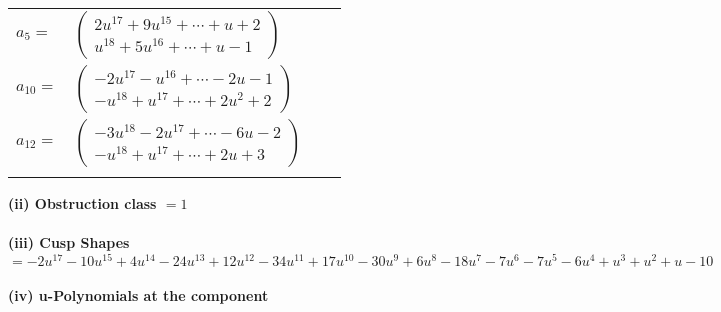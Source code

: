 \documentclass[1p]{elsarticle_modified}
\theoremstyle{definition}
\begin{document}
\begin{tabular}{m{7pt} m{180pt} m{7pt} m{180pt} }
\flushright $a_{5}=$&$\begin{pmatrix}2 u^{17}+9 u^{15}+\cdots+u+2\\u^{18}+5 u^{16}+\cdots+u-1\end{pmatrix}$ \\
\flushright $a_{10}=$&$\begin{pmatrix}-2 u^{17}- u^{16}+\cdots-2 u-1\\- u^{18}+u^{17}+\cdots+2 u^2+2\end{pmatrix}$ \\
\flushright $a_{12}=$&$\begin{pmatrix}-3 u^{18}-2 u^{17}+\cdots-6 u-2\\- u^{18}+u^{17}+\cdots+2 u+3\end{pmatrix}$\\&\end{tabular}
\flushleft \textbf{(ii) Obstruction class $= 1$}\\~\\
\flushleft \textbf{(iii) Cusp Shapes $= -2 u^{17}-10 u^{15}+4 u^{14}-24 u^{13}+12 u^{12}-34 u^{11}+17 u^{10}-30 u^9+6 u^8-18 u^7-7 u^6-7 u^5-6 u^4+u^3+u^2+u-10$}\\~\\
\newpage\renewcommand{\arraystretch}{1}
\flushleft \textbf{(iv) u-Polynomials at the component}\newline \\
\end{document}
